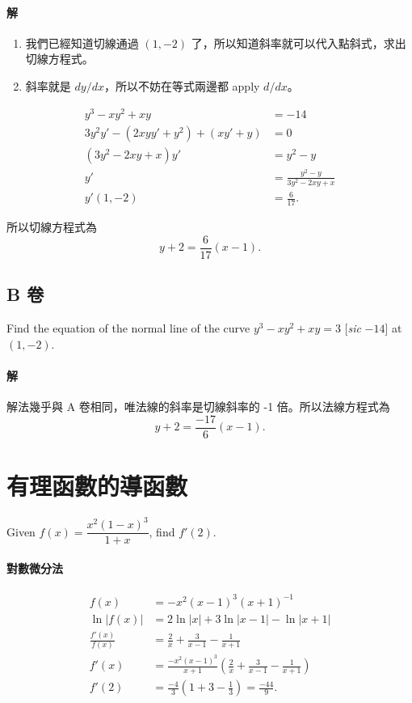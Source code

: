 \documentclass[a4paper,12pt]{article}
\begin{document}
\begin{CJK}{UTF8}{bsmi}
\paragraph{解}
\begin{enumerate}
\item 我們已經知道切線通過 $(1,-2)$ 了，所以知道斜率就可以代入點斜式，求出切線方程式。
\item 斜率就是 $dy/dx$，所以不妨在等式兩邊都 apply $d/dx$。
\end{enumerate}

\begin{align*}
y^3 - xy^2 + xy &= -14\\
3y^2 y' - (2xyy' + y^2) + (xy' + y) &= 0\\
(3y^2 - 2xy + x)y' &= y^2 - y\\
y' &= \frac{y^2 - y}{3y^2 - 2xy + x}\\
y'(1,-2) &= \frac{6}{17}.
\end{align*}

所以切線方程式為
\[ y+2 = \frac{6}{17}(x-1). \]

\subsection{B 卷}
Find the equation of the normal line of the curve $y^3 - xy^2 + xy = 3$ [\textit{sic} $-14$] at $(1,-2)$.
\paragraph{解}
解法幾乎與 A 卷相同，唯法線的斜率是切線斜率的 -1 倍。所以法線方程式為
\[ y+2 = \frac{-17}{6}(x-1). \]

\section{有理函數的導函數}
Given $f(x)=\dfrac{x^2 (1-x)^3}{1+x}$, find $f'(2)$.

\paragraph{對數微分法}
\begin{align*}
f(x) &= -x^2 (x-1)^3 (x+1)^{-1}\\
\ln |f(x)| &= 2 \ln |x| + 3 \ln |x-1| - \ln |x+1|\\
\frac{f'(x)}{f(x)} &= \frac{2}{x} + \frac{3}{x-1} - \frac{1}{x+1}\\
f'(x) &= \frac{-x^2 (x-1)^3}{x+1}\left(\frac{2}{x} + \frac{3}{x-1} - \frac{1}{x+1}\right)\\
f'(2) &= \frac{-4}{3}\left(1 + 3 - \frac{1}{3}\right) = \frac{-44}{9}.
\end{align*}


\end{CJK}
\end{document}
